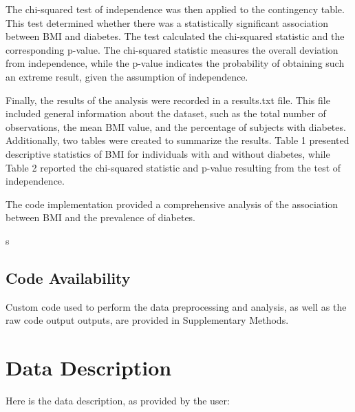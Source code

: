 \documentclass[11pt]{article}
\begin{document}
The chi-squared test of independence was then applied to the contingency table. This test determined whether there was a statistically significant association between BMI and diabetes. The test calculated the chi-squared statistic and the corresponding p-value. The chi-squared statistic measures the overall deviation from independence, while the p-value indicates the probability of obtaining such an extreme result, given the assumption of independence.

Finally, the results of the analysis were recorded in a results.txt file. This file included general information about the dataset, such as the total number of observations, the mean BMI value, and the percentage of subjects with diabetes. Additionally, two tables were created to summarize the results. Table 1 presented descriptive statistics of BMI for individuals with and without diabetes, while Table 2 reported the chi-squared statistic and p-value resulting from the test of independence.

The code implementation provided a comprehensive analysis of the association between BMI and the prevalence of diabetes. 

s\subsection*{Code Availability}

Custom code used to perform the data preprocessing and analysis, as well as the raw code output outputs, are provided in Supplementary Methods.




\clearpage
\appendix
\section*{Data Description} \label{sec:data_description} Here is the data description, as provided by the user:
\end{document}
